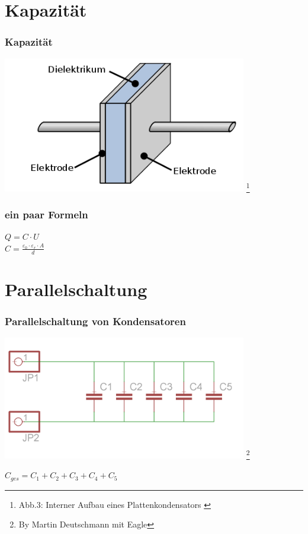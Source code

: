 \section*{Kapazität}

\begin{frame}
    \frametitle{Kapazität}
	
	\begin{center}
        \includegraphics[width=0.8\textwidth]{e05/c-aufbau.png}
        \footnote{Abb.3: Interner Aufbau eines Plattenkondensators \cite{wp}}
    \end{center}
 	

\end{frame}

\begin{frame}
	\frametitle{ein paar Formeln}
	\begin{center}
		\huge{$Q = C \cdot U$}\\
		\vspace{2cm}
		\huge{$C= \frac{\varepsilon_{0} \cdot \varepsilon_{r} \cdot A}{d}$}
	\end{center}
   
   
\end{frame}

\section*{Parallelschaltung}

\begin{frame}
    \frametitle{Parallelschaltung von Kondensatoren}
	
	\begin{center}
        \includegraphics[width=0.8\textwidth]{e05/c-parallel.png}
        \footnote{\tiny By Martin Deutschmann mit Eagle}
    \end{center}
 	\huge{$C_{ges} = C_{1} + C_{2} + C_{3} + C_{4} + C_{5}$} 

\end{frame}
	
